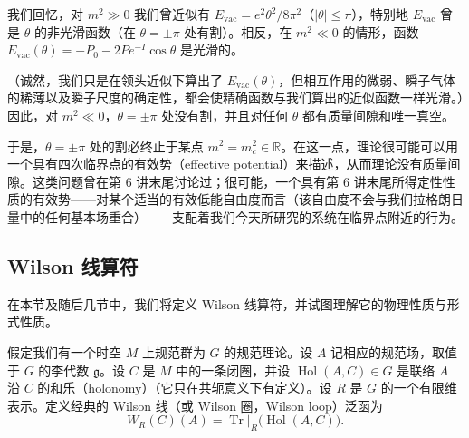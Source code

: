我们回忆，对 $m^2\gg0$ 我们曾近似有 $E_{\mathrm{vac}}=e^2\theta^2/8\pi^2$（$|\theta|\le\pi$），特别地 $E_{\mathrm{vac}}$ 曾是 $\theta$ 的非光滑函数（在 $\theta=\pm\pi$ 处有割）。相反，在 $m^2\ll0$ 的情形，函数 $E_{\mathrm{vac}}(\theta)=-P_0-2Pe^{-I}\cos\theta$ 是光滑的。



（诚然，我们只是在领头近似下算出了 $E_{\mathrm{vac}}(\theta)$，但相互作用的微弱、瞬子气体的稀薄以及瞬子尺度的确定性，都会使精确函数与我们算出的近似函数一样光滑。）因此，对 $m^2\ll0$，$\theta=\pm\pi$ 处没有割，并且对任何 $\theta$ 都有质量间隙和唯一真空。

于是，$\theta=\pm\pi$ 处的割必终止于某点 $m^2=m_c^2\in\mathbb{R}$。在这一点，理论很可能可以用一个具有四次临界点的有效势（effective potential）来描述，从而理论没有质量间隙。这类问题曾在第 6 讲末尾讨论过；很可能，一个具有第 6 讲末尾所得定性性质的有效势——对某个适当的有效低能自由度而言（该自由度不会与我们拉格朗日量中的任何基本场重合）——支配着我们今天所研究的系统在临界点附近的行为。

\subsection{Wilson 线算符}

在本节及随后几节中，我们将定义 Wilson 线算符，并试图理解它的物理性质与形式性质。

假定我们有一个时空 $M$ 上规范群为 $G$ 的规范理论。设 $A$ 记相应的规范场，取值于 $G$ 的李代数 $\mathfrak{g}$。设 $C$ 是 $M$ 中的一条闭圈，并设 $\operatorname{Hol}(A,C)\in G$ 是联络 $A$ 沿 $C$ 的和乐（holonomy）（它只在共轭意义下有定义）。设 $R$ 是 $G$ 的一个有限维表示。定义经典的 Wilson 线（或 Wilson 圈，Wilson loop）泛函为
\begin{equation}
  \tag{7.8}
  \label{eq:7-8}
  W_R(C)(A)=\operatorname{Tr}|_R\bigl(\operatorname{Hol}(A,C)\bigr).
\end{equation}


